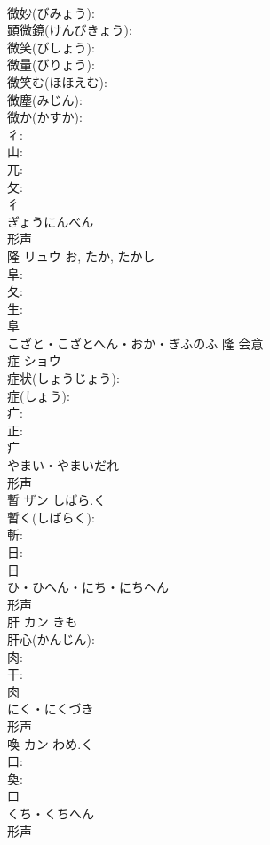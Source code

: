 \documentclass[8pt]{extreport}
\begin{document}
\begin{CJK}{UTF8}{min}
\\	微妙(びみょう): 
\\	顕微鏡(けんびきょう): 
\\	微笑(びしょう): 
\\	微量(びりょう): 
\\	微笑む(ほほえむ): 
\\	微塵(みじん): 
\\	微か(かすか): 
\\	彳: 
\\	山: 
\\	兀: 
\\	攵: 
\\	彳	
\\	ぎょうにんべん	
\\	形声 
\\	隆	リュウ		お, たか, たかし	
\\	阜: 
\\	夂: 
\\	生: 
\\	阜	
\\	こざと・こざとへん・おか・ぎふのふ	隆	会意 
\\	症	ショウ			
\\	症状(しょうじょう): 
\\	症(しょう): 
\\	疒: 
\\	正: 
\\	疒	
\\	やまい・やまいだれ	
\\	形声 
\\	暫	ザン	しばら.く		
\\	暫く(しばらく): 
\\	斬: 
\\	日: 
\\	日	
\\	ひ・ひへん・にち・にちへん	
\\	形声 
\\	肝	カン	きも		
\\	肝心(かんじん): 
\\	肉: 
\\	干: 
\\	肉	
\\	にく・にくづき	
\\	形声 
\\	喚	カン	わめ.く		
\\	口: 
\\	奐: 
\\	口	
\\	くち・くちへん	
\\	形声 

\end{CJK}
\end{document}
